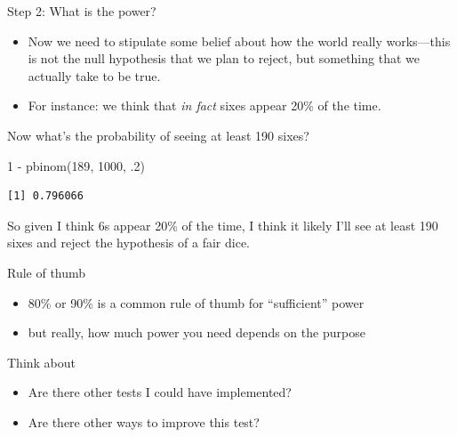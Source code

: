 \documentclass[
  11pt,
  ignorenonframetext,
]{beamer}
\newenvironment{Shaded}{\begin{snugshade}}{\end{snugshade}}
\newcommand{\DecValTok}[1]{\textcolor[rgb]{0.68,0.00,0.00}{#1}}
\newcommand{\FunctionTok}[1]{\textcolor[rgb]{0.28,0.35,0.67}{#1}}
\newcommand{\NormalTok}[1]{\textcolor[rgb]{0.00,0.23,0.31}{#1}}
\newcommand{\SpecialCharTok}[1]{\textcolor[rgb]{0.37,0.37,0.37}{#1}}
\providecommand{\tightlist}{%
  \setlength{\itemsep}{0pt}\setlength{\parskip}{0pt}}\usepackage{longtable,booktabs,array}
\begin{document}
\begin{frame}[fragile]{Step 2: What is the power?}
\protect\hypertarget{step-2-what-is-the-power}{}
\begin{itemize}
\item
  Now we need to stipulate some belief about how the world really
  works---this is not the null hypothesis that we plan to reject, but
  something that we actually take to be true.
\item
  For instance: we think that \emph{in fact} sixes appear 20\% of the
  time.
\end{itemize}

Now what's the probability of seeing at least 190 sixes?

\begin{Shaded}
\begin{Highlighting}[]
\DecValTok{1} \SpecialCharTok{{-}} \FunctionTok{pbinom}\NormalTok{(}\DecValTok{189}\NormalTok{, }\DecValTok{1000}\NormalTok{, .}\DecValTok{2}\NormalTok{)}
\end{Highlighting}
\end{Shaded}

\begin{verbatim}
[1] 0.796066
\end{verbatim}

So given I think 6s appear 20\% of the time, I think it likely I'll see
at least 190 sixes and reject the hypothesis of a fair dice.
\end{frame}

\begin{frame}{Rule of thumb}
\protect\hypertarget{rule-of-thumb}{}
\begin{itemize}
\tightlist
\item
  80\% or 90\% is a common rule of thumb for ``sufficient'' power
\item
  but really, how much power you need depends on the purpose
\end{itemize}
\end{frame}

\begin{frame}{Think about}
\protect\hypertarget{think-about}{}
\begin{itemize}
\tightlist
\item
  Are there other tests I could have implemented?
\item
  Are there other ways to improve this test?
\end{itemize}
\end{frame}
\end{document}
